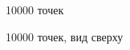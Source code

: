 \documentclass{article}
\begin{document}
\begin{figure}[h]
\caption{10000 точек}
\label{ris:image}
\end{figure}

\begin{figure}[h]
\caption{10000 точек, вид сверху}
\label{ris:image}
\end{figure}
\end{document}

